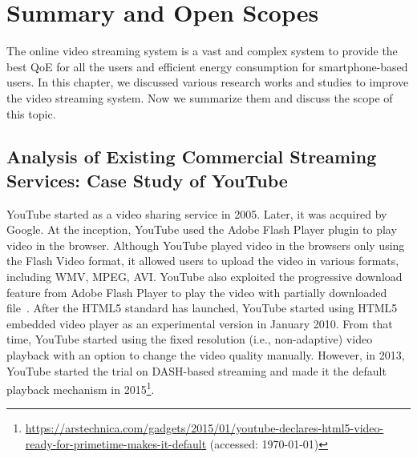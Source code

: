 \section{Summary and Open Scopes}
The online video streaming system is a vast and complex system to provide the best \ac{QoE} for all the users and efficient energy consumption for smartphone-based users. In this chapter, we discussed various research works and studies to improve the video streaming system. Now we summarize them and discuss the scope of this topic.

\subsection{Analysis of Existing Commercial Streaming Services: Case Study of YouTube}
YouTube started as a video sharing service in 2005. Later, it was acquired by Google. At the inception, YouTube used the Adobe Flash Player plugin to play video in the browser. Although YouTube played video in the browsers only using the Flash Video format, it allowed users to upload the video in various formats, including WMV, MPEG, AVI. YouTube also exploited the progressive download feature from Adobe Flash Player to play the video with partially downloaded file~\cite{gill2007youtube}. After the HTML5 standard has launched, YouTube started using \ac{HTML5} embedded video player as an experimental version in January 2010. From that time, YouTube started using the fixed resolution (i.e., non-adaptive) video playback with an option to change the video quality manually. However, in 2013, YouTube started the trial on \ac{DASH}-based streaming and made it the default playback mechanism in 2015\footnote{\url{https://arstechnica.com/gadgets/2015/01/youtube-declares-html5-video-ready-for-primetime-makes-it-default} (accessed: \today)}.

